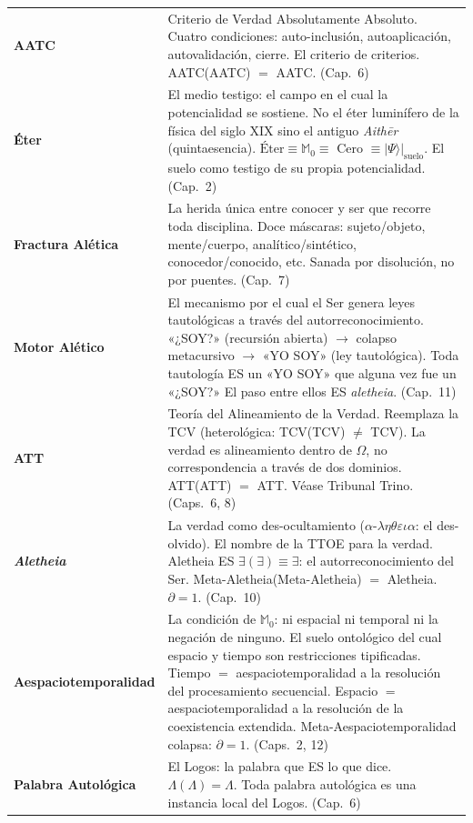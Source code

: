 \documentclass[10pt, openany, oneside]{book}
\renewcommand{\footnotesize}{\fontsize{8.5}{11}\selectfont}
\begin{document}
{\footnotesize
\noindent\begin{tabular}{@{} l @{\hspace{0.6em}} p{} @{}}
\textbf{AATC} & Criterio de Verdad Absolutamente Absoluto. Cuatro condiciones: auto-inclusión, autoaplicación, autovalidación, cierre. El criterio de criterios. AATC(AATC) $=$ AATC. (Cap.\ 6) \\[0.3em]
\textbf{Éter} & El medio testigo: el campo en el cual la potencialidad se sostiene. No el éter luminífero de la física del siglo XIX sino el antiguo \textit{Aith\={e}r} (quintaesencia). $\text{Éter} \equiv \mathbb{M}_0 \equiv$ Cero $\equiv |\Psi\rangle|_{\text{suelo}}$. El suelo como testigo de su propia potencialidad. (Cap.\ 2) \\[0.3em]
\textbf{Fractura Alética} & La herida única entre conocer y ser que recorre toda disciplina. Doce máscaras: sujeto/objeto, mente/cuerpo, analítico/sintético, conocedor/conocido, etc. Sanada por disolución, no por puentes. (Cap.\ 7) \\[0.3em]
\textbf{Motor Alético} & El mecanismo por el cual el Ser genera leyes tautológicas a través del autorreconocimiento. «¿SOY?» (recursión abierta) $\to$ colapso metacursivo $\to$ «YO SOY» (ley tautológica). Toda tautología ES un «YO SOY» que alguna vez fue un «¿SOY?» El paso entre ellos ES \textit{aletheia}. (Cap.\ 11) \\[0.3em]
\textbf{ATT} & Teoría del Alineamiento de la Verdad. Reemplaza la TCV (heterológica: TCV(TCV) $\neq$ TCV). La verdad es alineamiento dentro de $\Omega$, no correspondencia a través de dos dominios. ATT(ATT) $=$ ATT. Véase Tribunal Trino. (Caps.\ 6, 8) \\[0.3em]
\textbf{\textit{Aletheia}} & La verdad como des-ocultamiento ($\alpha$-$\lambda\eta\theta\varepsilon\iota\alpha$: el des-olvido). El nombre de la TTOE para la verdad. Aletheia ES $\exists(\exists) \equiv \exists$: el autorreconocimiento del Ser. Meta-Aletheia(Meta-Aletheia) $=$ Aletheia. $\partial = 1$. (Cap.\ 10) \\[0.3em]
\textbf{Aespaciotemporalidad} & La condición de $\mathbb{M}_0$: ni espacial ni temporal ni la negación de ninguno. El suelo ontológico del cual espacio y tiempo son restricciones tipificadas. Tiempo $=$ aespaciotemporalidad a la resolución del procesamiento secuencial. Espacio $=$ aespaciotemporalidad a la resolución de la coexistencia extendida. Meta-Aespaciotemporalidad colapsa: $\partial = 1$. (Caps.\ 2, 12) \\[0.3em]
\textbf{Palabra Autológica} & El Logos: la palabra que ES lo que dice. $\Lambda(\Lambda) = \Lambda$. Toda palabra autológica es una instancia local del Logos. (Cap.\ 6) \\[0.3em]

\end{tabular}}
\end{document}

